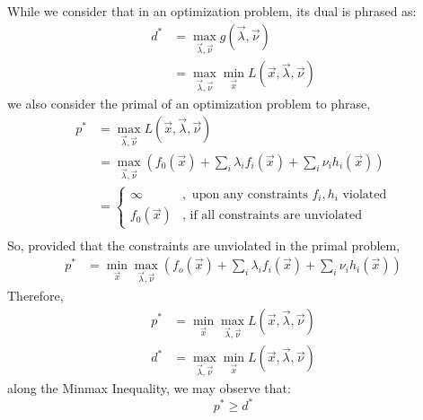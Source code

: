 While we consider that in an optimization problem, its dual is phrased as:
\begin{align*}
    d^* &= \max_{\vec{\lambda}, \vec{\nu}} g(\vec{\lambda}, \vec{\nu}) \\
    &= \max_{\vec{\lambda}, \vec{\nu}} \min_{\vec{x}} L(\vec{x}, \vec{\lambda}, \vec{\nu})
\end{align*}
we also consider the primal of an optimization problem to phrase,
\begin{align*}
    p^* &= \max_{\vec{\lambda}, \vec{\nu}} L(\vec{x}, \vec{\lambda}, \vec{\nu}) \\
    &= \max_{\vec{\lambda}, \vec{\nu}} (f_0(\vec{x}) + \sum_i \lambda_i f_i(\vec{x}) + \sum_i \nu_i h_i (\vec{x})) \\
    &= \begin{cases}
        \infty &,\text{ upon any constraints $f_i, h_i$ violated} \\
        f_0(\vec{x}) &,\text{ if all constraints are unviolated}
    \end{cases} \\
\end{align*}
So, provided that the constraints are unviolated in the primal problem,
\begin{align*}
    p^* &= \min_{\vec{x}} \max_{\vec{\lambda}, \vec{\nu}} (f_o(\vec{x}) + \sum_i \lambda_i f_i(\vec{x}) + \sum_i \nu_i h_i (\vec{x}))
\end{align*}
Therefore,
\begin{align*}
    p^* &= \min_{\vec{x}} \max_{\vec{\lambda}, \vec{\nu}} L(\vec{x}, \vec{\lambda}, \vec{\nu}) \\
    d^* &= \max_{\vec{\lambda}, \vec{\nu}} \min_{\vec{x}} L(\vec{x}, \vec{\lambda}, \vec{\nu})
\end{align*}
along the Minmax Inequality, we may observe that:
\[
    p^* \geq d^*
\]
